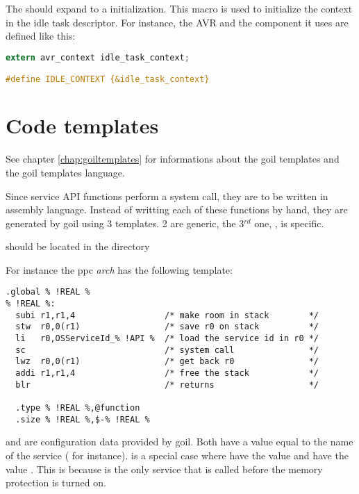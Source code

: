 The  should expand to a  initialization. This macro is used to initialize the context in the idle task descriptor.  For instance, the AVR  and the component it uses are defined like this:

\begin{lstlisting}[language=C]
extern avr_context idle_task_context;

#define IDLE_CONTEXT {&idle_task_context} 
\end{lstlisting}

\section{Code templates}

See chapter \ref{chap:goiltemplates} for informations about the goil templates and the goil templates language.

Since service API functions perform a system call, they are to be written in assembly language. Instead of writting each of these functions by hand, they are generated by goil using 3 templates. 2 are generic, the 3$^{rd}$ one, , is specific.

 should be located in the  directory

For instance the ppc {\em arch} has the following template:

\begin{lstlisting}[language=goilTemplate]
  .global % !REAL %
% !REAL %:
  subi r1,r1,4                  /* make room in stack        */
  stw  r0,0(r1)                 /* save r0 on stack          */
  li   r0,OSServiceId_% !API %  /* load the service id in r0 */
  sc                            /* system call               */
  lwz  r0,0(r1)                 /* get back r0               */
  addi r1,r1,4                  /* free the stack            */
  blr                           /* returns                   */
  
  .type % !REAL %,@function
  .size % !REAL %,$-% !REAL %

\end{lstlisting}

 and  are configuration data provided by goil. Both have a value equal to the name of the service ( for instance).  is a special case where  have the value  and  have the value . This is because  is the only service that is called before the memory protection is turned on.

